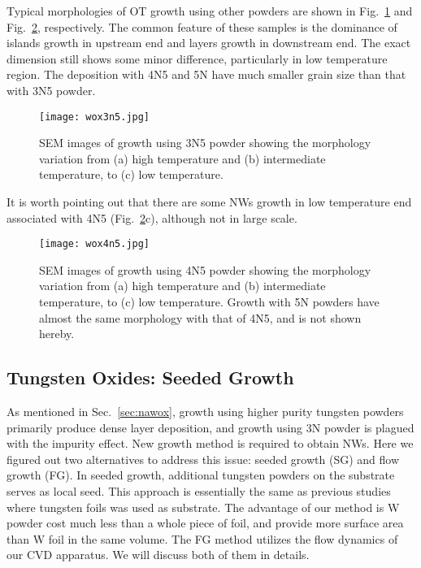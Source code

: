 Typical morphologies of OT growth using other powders are shown in Fig.~\ref{fig:wox3n5} and Fig.~\ref{fig:wox4n5}, respectively. The common feature of these samples is the dominance of islands growth in upstream end and layers growth in downstream end. The exact dimension still shows some minor difference, particularly in low temperature region. The deposition with 4N5 and 5N have much smaller grain size than that with 3N5 powder.
\begin{figure}[htb]
\centering
\texttt{[image: wox3n5.jpg]}
\caption[SEM images of  growth using 3N5 powder]{SEM images of  growth using 3N5 powder showing the morphology variation from (a) high temperature and (b) intermediate temperature, to (c) low temperature.}
\label{fig:wox3n5}
\end{figure}
It is worth pointing out that there are some NWs growth in low temperature end associated with 4N5 (Fig.~\ref{fig:wox4n5}c), although not in large scale.
\begin{figure}[htb]
\centering
\texttt{[image: wox4n5.jpg]}
\caption[SEM images of  growth using 4N5 powder]{SEM images of  growth using 4N5 powder showing the morphology variation from (a) high temperature and (b) intermediate temperature, to (c) low temperature. Growth with 5N powders have almost the same morphology with that of 4N5, and is not shown hereby.}
\label{fig:wox4n5}
\end{figure}


\subsection{Tungsten Oxides: Seeded Growth }\label{sec:sgfg}

As mentioned in Sec.~\ref{sec:nawox}, growth using higher purity tungsten powders primarily produce dense layer deposition, and growth using 3N powder is plagued with the impurity effect. New growth method is required to obtain  NWs. Here we figured out two alternatives to address this issue: seeded growth (SG) and flow growth (FG). In seeded growth, additional tungsten powders on the substrate serves as local seed. This approach is essentially the same as previous studies where tungsten foils was used as substrate. The advantage of our method is W powder cost much less than a whole piece of foil, and provide more surface area than W foil in the same volume. The FG method utilizes the flow dynamics of our CVD apparatus. We will discuss both of them in details.

